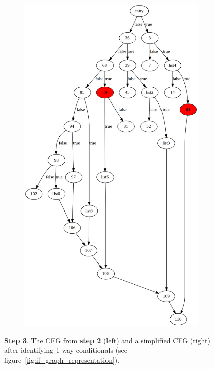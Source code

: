 \begin{figure}[htbp]
\begin{subfigure}[ht]{0.45\textwidth}
		\includegraphics[width=\textwidth]{inc/appendices/control_flow_analysis_example/step3_after.png}
	\end{subfigure}
	\caption{\textbf{Step 3}. The CFG from \textbf{step 2} (left) and a simplified CFG (right) after identifying 1-way conditionals (see figure~\ref{fig:if_graph_representation}).}
	\label{fig:step_3}
\end{figure}

